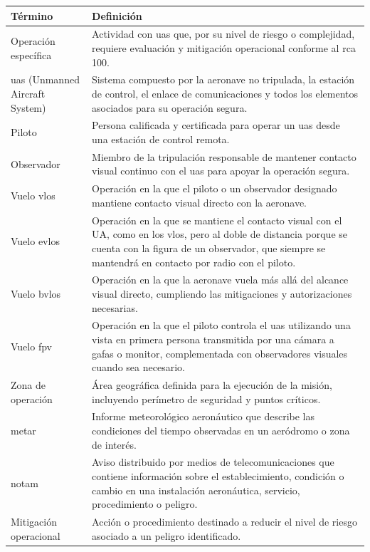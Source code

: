 \begin{longtable}{@{}p{5cm}p{10cm}@{}}
\toprule
\textbf{Término} & \textbf{Definición} \\ \midrule
\endhead
Operación específica & Actividad con \gls{uas} que, por su nivel de riesgo o complejidad, requiere evaluación y mitigación operacional conforme al \gls{rca} 100. \\
\gls{uas} (Unmanned Aircraft System) & Sistema compuesto por la aeronave no tripulada, la estación de control, el enlace de comunicaciones y todos los elementos asociados para su operación segura. \\
Piloto & Persona calificada y certificada para operar un \gls{uas} desde una estación de control remota. \\
Observador & Miembro de la tripulación responsable de mantener contacto visual continuo con el \gls{uas} para apoyar la operación segura. \\
Vuelo \gls{vlos} & Operación en la que el piloto o un observador designado mantiene contacto visual directo con la aeronave. \\
Vuelo \gls{evlos}  & Operación en la que se mantiene el contacto visual con el UA, como en los \gls{vlos}, pero al doble de distancia porque se cuenta con la figura de un observador, que siempre se mantendrá en contacto por radio con el piloto. \\
Vuelo \gls {bvlos} & Operación en la que la aeronave vuela más allá del alcance visual directo, cumpliendo las mitigaciones y autorizaciones necesarias. \\
Vuelo \gls{fpv} & Operación en la que el piloto controla el \gls{uas} utilizando una vista en primera persona transmitida por una cámara a gafas o monitor, complementada con observadores visuales cuando sea necesario. \\
Zona de operación & Área geográfica definida para la ejecución de la misión, incluyendo perímetro de seguridad y puntos críticos. \\
\gls{metar} & Informe meteorológico aeronáutico que describe las condiciones del tiempo observadas en un aeródromo o zona de interés. \\
\gls{notam} & Aviso distribuido por medios de telecomunicaciones que contiene información sobre el establecimiento, condición o cambio en una instalación aeronáutica, servicio, procedimiento o peligro. \\
Mitigación operacional & Acción o procedimiento destinado a reducir el nivel de riesgo asociado a un peligro identificado. \\

\end{longtable}
